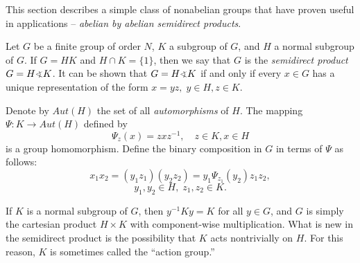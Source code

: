 
This section describes %
a simple class of nonabelian groups that have
proven useful in applications -- 
\emph{abelian by abelian semidirect products}. 


Let $G$ be a finite group of order $N$, $K$ a subgroup of $G$,
and $H$ a normal subgroup of $G$. If $G = HK$ and $H \cap
K = \{1\}$, then we say that $G$ is the 
\emph{semidirect product} $G = H \sdp K$. 
It can be shown that $G = H \sdp K$ if and only if every $x \in
G$ has a unique representation of the form $x = yz, \; y\in H,
z\in K$.

Denote by $Aut(H)$ the set of all \emph{automorphisms} of
$H$. The mapping $\Psi:K\rightarrow Aut(H)$ defined by  
\begin{equation}\label{eq:homo}
\Psi_z(x) = zxz^{-1}, \quad z\in K, x\in H
\end{equation}
is a group homomorphism. 
Define the binary composition in $G$
in terms of $\Psi$ as follows:
\begin{equation}\label{eq:PsiProd}
x_1x_2 = (y_1z_1)(y_2z_2)= y_1\Psi_{z_1}(y_2)z_1z_2,
\end{equation}
\[
y_1, y_2 \in H,\; z_1, z_2 \in K. 
\]

If $K$ is a normal subgroup of $G$,
then $y^{-1}Ky = K$ for all $y\in G$, 
and $G$ is simply the cartesian product $H\times K$ 
with component-wise multiplication. 
What is new in the semidirect product is
the possibility that $K$ acts nontrivially on $H$. 
For this reason, $K$ is sometimes called the ``action group.''

